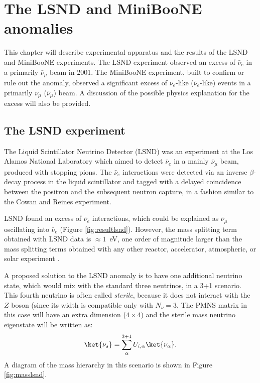 \chapter{The LSND and MiniBooNE anomalies}

\minitoc

This chapter will describe experimental apparatus and the results of the LSND and MiniBooNE experiments. The LSND experiment observed an excess of $\bar{\nu}_{e}$ in a primarily $\bar{\nu}_{\mu}$ beam in 2001. The MiniBooNE experiment, built to confirm or rule out the anomaly, observed a significant excess of $\nu_{e}$-like ($\bar{\nu}_{e}$-like) events in a primarily $\nu_{\mu}$ ($\bar{\nu}_{\mu}$) beam. A discussion of the possible physics explanation for the excess will also be provided.

\section{The LSND experiment}
The Liquid Scintillator Neutrino Detector (LSND) was an experiment at the Los Alamos National Laboratory which aimed to detect $\bar{\nu}_e$ in a mainly $\bar{\nu}_{\mu}$ beam, produced with stopping pions. The $\bar{\nu}_e$ interactions were detected via an inverse $\beta$-decay process in the liquid scintillator and tagged with a delayed coincidence between the positron and the subsequent neutron capture, in a fashion similar to the Cowan and Reines experiment. 

LSND found an excess of $\bar{\nu}_e$ interactions, which could be explained as $\bar{\nu}_\mu$ oscillating into $\bar{\nu}_e$ (Figure \ref{fig:resultlsnd}). However, the mass splitting term obtained with LSND data is $\approx1$~eV, one order of magnitude larger than the mass splitting terms obtained with any other reactor, accelerator, atmospheric, or solar experiment \cite{Aguilar:2001ty}. 

A proposed solution to the LSND anomaly is to have one additional neutrino state, which would mix with the standard three neutrinos, in a 3+1 scenario. This fourth neutrino is often called \emph{sterile}, because it does not interact with the $Z$ boson (since its width is compatible only with $N_{\nu}=3$. The PMNS matrix in this case will have an extra dimension ($4\times4$) and the sterile mass neutrino eigenstate will be written as:
\begin{equation}
    \ket{\nu_s}=\sum^{3+1}_{\alpha}U_{i,\alpha}\ket{\nu_{\alpha}}.
\end{equation}
A diagram of the mass hierarchy in this scenario is shown in Figure \ref{fig:masslsnd}.

